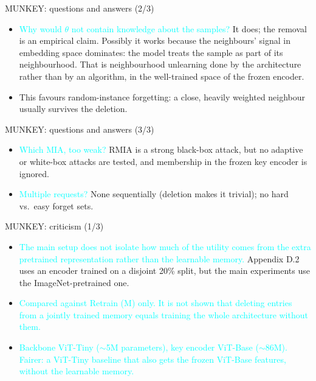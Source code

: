\documentclass{beamer}
\newcommand{\pierre}[1]{\textcolor{cyan}{#1}}
\begin{document}
\begin{frame}{MUNKEY: questions and answers (2/3)}
\begin{itemize}
  \item \pierre{Why would $\theta$ not contain knowledge about the samples?}
        It does; the removal is an empirical claim. Possibly it works because
        the neighbours' signal in embedding space dominates: the model treats
        the sample as part of its neighbourhood. That is neighbourhood
        unlearning done by the architecture rather than by an algorithm, in the
        well-trained space of the frozen encoder.
  \item This favours random-instance forgetting: a close, heavily weighted
        neighbour usually survives the deletion.
\end{itemize}
\end{frame}

\begin{frame}{MUNKEY: questions and answers (3/3)}
\begin{itemize}
  \item \pierre{Which MIA, too weak?} RMIA is a strong black-box attack, but
        no adaptive or white-box attacks are tested, and membership in the
        frozen key encoder is ignored.
  \item \pierre{Multiple requests?} None sequentially (deletion makes it
        trivial); no hard vs.\ easy forget sets.
\end{itemize}
\end{frame}

\begin{frame}{MUNKEY: criticism (1/3)}
\begin{itemize}
  \item \pierre{The main setup does not isolate how much of the utility comes from
        the extra pretrained representation rather than the learnable memory.}
        Appendix D.2 uses an encoder trained on a disjoint 20\% split, but the
        main experiments use the ImageNet-pretrained one.
  \item \pierre{Compared against Retrain (M) only. It is not shown that deleting
        entries from a jointly trained memory equals training the whole
        architecture without them.}
  \item \pierre{Backbone ViT-Tiny ($\sim$5M parameters), key encoder ViT-Base
        ($\sim$86M). Fairer: a ViT-Tiny baseline that also gets the frozen
        ViT-Base features, without the learnable memory.}
\end{itemize}
\end{frame}
\end{document}

